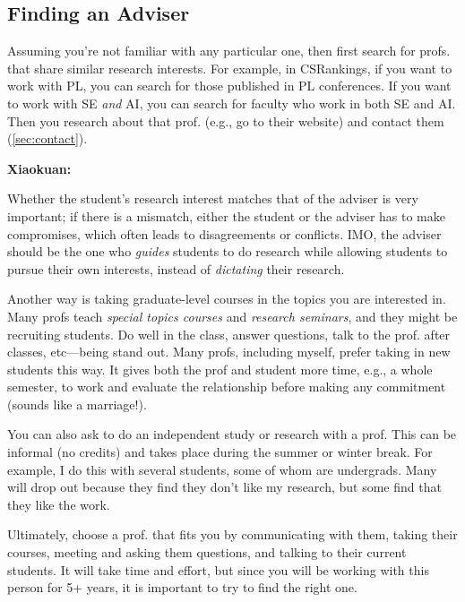 \documentclass[oneside,11pt,dvipsnames]{book}
\newenvironment{commentbox}[1][]{
  \small
  \begin{mybox}
    {\small \textbf{#1}}
  }{
  \end{mybox}
}
\begin{document}
\subsection{Finding an Adviser}

Assuming you're not familiar with any particular one, then first search for profs. that share similar research interests.  For example, in CSRankings, if you want to work with PL, you can search for those published in PL conferences.  If you want to work with SE \emph{and} AI, you can search for faculty who work in both SE and AI.  Then you research about that prof. (e.g., go to their website) and contact them (\autoref{sec:contact}).

\begin{commentbox}[Xiaokuan:]
  Whether the student's research interest matches that of the adviser is very important;
  if there is a mismatch,
  either the student or the adviser has to make compromises,
  which often leads to disagreements or conflicts.
  IMO, the adviser should be the one who \emph{guides}  students to do research while allowing students to pursue their own interests,
  instead of \emph{dictating} their research.
\end{commentbox}


Another way is taking graduate-level courses in the topics you are interested in.  Many profs teach \emph{special topics courses} and \emph{research seminars}, and they might be recruiting students. Do well in the class, answer questions, talk to the prof. after classes, etc---being stand out.  Many profs, including myself, prefer taking in new students this way.  It gives both the prof and student more time, e.g., a whole semester, to work and evaluate the relationship before making any commitment (sounds like a marriage!).

You can also ask to do an independent study or research with a prof. This can be informal (no credits) and takes place during the summer or winter break.  For example, I do this with several students, some of whom are undergrads. Many will drop out because they find they don't like my research, but some find that they like the work.

Ultimately, choose a prof. that fits you by communicating with them, taking their courses, meeting and asking them questions, and talking to their current students. It will take time and effort, but since you will be working with this person for 5+ years, it is important to try to find the right one.
\end{document}
